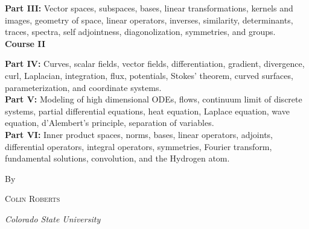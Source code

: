 \begin{titlepage}
    \noindent\textbf{Part III:} Vector spaces, subspaces, bases, linear transformations, kernels and images, geometry of space, linear operators, inverses, similarity, determinants, traces, spectra, self adjointness, diagonolization, symmetries, and groups.   \\%

    \vspace*{1cm}
    \noindent\textbf{\large{Course II}}

	\noindent\textbf{Part IV:} Curves, scalar fields, vector fields, differentiation, gradient, divergence, curl, Laplacian, integration, flux, potentials, Stokes' theorem, curved surfaces, parameterization, and coordinate systems.\\

    \noindent\textbf{Part V:} Modeling of high dimensional ODEs, flows, continuum limit of discrete systems, partial differential equations, heat equation, Laplace equation, wave equation, d'Alembert's principle, separation of variables.\\

    \noindent\textbf{Part VI:} Inner product spaces, norms, bases, linear operators, adjoints, differential operators, integral operators, symmetries, Fourier transform, fundamental solutions, convolution, and the Hydrogen atom.


	\vspace*{3\baselineskip} %


	By

	\vspace{0.5\baselineskip} %

	{\scshape\Large Colin Roberts \\} %

	\vspace{0.5\baselineskip} %

	\textit{Colorado State University} %

	\vfill %



\end{titlepage}
